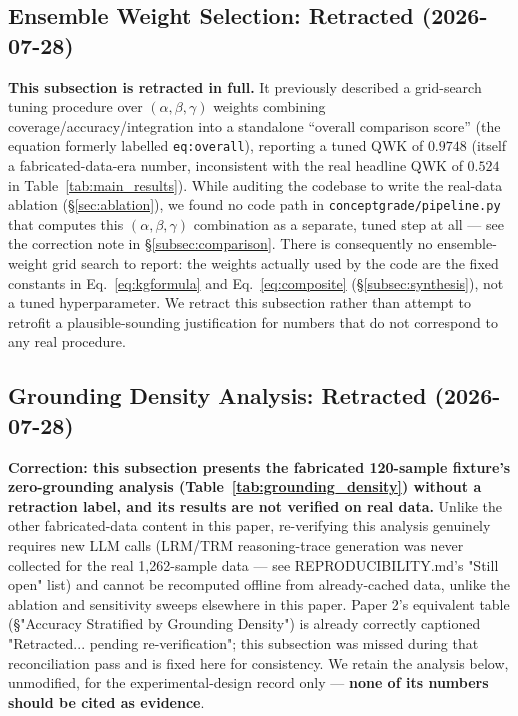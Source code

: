 \documentclass[conference]{IEEEtran}
\begin{document}
\subsection{Ensemble Weight Selection: Retracted (2026-07-28)}

\textbf{This subsection is retracted in full.} It previously described a
grid-search tuning procedure over $(\alpha,\beta,\gamma)$ weights
combining coverage/accuracy/integration into a standalone ``overall
comparison score'' (the equation formerly labelled \texttt{eq:overall}),
reporting a tuned QWK of $0.9748$ (itself a fabricated-data-era number,
inconsistent with the real headline QWK of $0.524$ in
Table~\ref{tab:main_results}). While auditing the codebase to write the
real-data ablation (\S\ref{sec:ablation}), we found no code path in
\texttt{conceptgrade/pipeline.py} that computes this $(\alpha,\beta,\gamma)$
combination as a separate, tuned step at all --- see the correction note
in \S\ref{subsec:comparison}. There is consequently no ensemble-weight
grid search to report: the weights actually used by the code are the
fixed constants in Eq.~\ref{eq:kgformula} and Eq.~\ref{eq:composite}
(\S\ref{subsec:synthesis}), not a tuned hyperparameter. We retract this
subsection rather than attempt to retrofit a plausible-sounding
justification for numbers that do not correspond to any real procedure.

\subsection{Grounding Density Analysis: Retracted (2026-07-28)}

\textbf{Correction: this subsection presents the fabricated 120-sample
fixture's zero-grounding analysis (Table~\ref{tab:grounding_density})
without a retraction label, and its results are not verified on real
data.} Unlike the other fabricated-data content in this paper,
re-verifying this analysis genuinely requires new LLM calls (LRM/TRM
reasoning-trace generation was never collected for the real 1{,}262-sample
data --- see REPRODUCIBILITY.md's "Still open" list) and cannot be
recomputed offline from already-cached data, unlike the ablation and
sensitivity sweeps elsewhere in this paper. Paper 2's equivalent table
(\S"Accuracy Stratified by Grounding Density") is already correctly
captioned "Retracted... pending re-verification"; this subsection was
missed during that reconciliation pass and is fixed here for
consistency. We retain the analysis below, unmodified, for the
experimental-design record only --- \textbf{none of its numbers should
be cited as evidence}.
\end{document}
